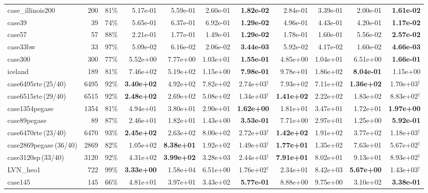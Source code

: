 \documentclass[10pt]{article}
\begin{document}
\begin{landscape}
\begin{table}[H]
\begin{tabular}{lrr rrrr rrrr}
case\_illinois200 & 200 & 81\% & 5.17e-01 & 5.59e-01 & 2.60e-01 & \textbf{1.82e-02} & 2.84e-01 & 3.39e-01 & 2.00e-01 & \textbf{1.61e-02} \\
case39 & 39 & 74\% & 5.65e-01 & 6.37e-01 & 6.92e-01 & \textbf{1.29e-02} & 4.96e-01 & 4.43e-01 & 4.20e-01 & \textbf{1.17e-02} \\
case57 & 57 & 88\% & 2.21e-01 & 1.77e-01 & 1.49e-01 & \textbf{1.29e-02} & 1.78e-01 & 1.60e-01 & 5.56e-02 & \textbf{2.57e-02} \\
case33bw & 33 & 97\% & 5.09e-02 & 6.16e-02 & 2.06e-02 & \textbf{3.44e-03} & 5.92e-02 & 4.17e-02 & 1.60e-02 & \textbf{4.66e-03} \\
case300 & 300 & 77\% & 5.52e+00 & 7.77e+00 & 1.03e+01 & \textbf{1.55e-01} & 4.85e+00 & 1.04e+01 & 6.51e+00 & \textbf{1.66e-01} \\
iceland & 189 & 81\% & 7.46e+02 & 5.19e+02 & 1.15e+00 & \textbf{7.98e-01} & 9.78e+01 & 1.86e+02 & \textbf{8.04e-01} & 1.15e+00 \\
case6495rte\,(25/40) & 6495 & 92\% & \textbf{3.40e+02} & 4.92e+02 & 7.82e+02 & 2.74e+03$^\dagger$ & 7.93e+02 & 7.11e+02 & \textbf{1.36e+02} & 1.70e+03$^\dagger$ \\
case6515rte\,(29/40) & 6515 & 92\% & \textbf{2.48e+02} & 2.69e+02 & 5.08e+02 & 1.34e+03$^\dagger$ & \textbf{1.41e+02} & 2.22e+02 & 1.83e+02 & 8.83e+02$^\dagger$ \\
case1354pegase & 1354 & 81\% & 4.94e+01 & 3.80e+01 & 2.90e+01 & \textbf{1.62e+00} & 1.81e+01 & 3.47e+01 & 1.72e+01 & \textbf{1.97e+00} \\
case89pegase & 89 & 87\% & 2.46e+01 & 1.82e+01 & 1.43e+00 & \textbf{3.53e-01} & 7.71e+00 & 2.97e+01 & 1.25e+00 & \textbf{5.92e-01} \\
case6470rte\,(23/40) & 6470 & 93\% & \textbf{2.45e+02} & 2.63e+02 & 8.00e+02 & 2.72e+03$^\dagger$ & \textbf{1.42e+02} & 1.91e+02 & 3.77e+02 & 1.18e+03$^\dagger$ \\
case2869pegase\,(36/40) & 2869 & 82\% & 1.05e+02 & \textbf{8.38e+01} & 1.92e+02 & 1.49e+03$^\dagger$ & \textbf{1.77e+01} & 1.35e+02 & 7.63e+01 & 5.67e+02$^\dagger$ \\
case3120sp\,(33/40) & 3120 & 92\% & 4.31e+02 & \textbf{3.99e+02} & 3.28e+03 & 2.44e+03$^\dagger$ & \textbf{7.91e+01} & 8.02e+01 & 9.13e+01 & 8.93e+02$^\dagger$ \\
LVN\_heo1 & 722 & 99\% & \textbf{3.33e+00} & 1.58e+04 & 6.51e+00 & 1.76e+02$^\dagger$ & 2.34e+01 & 8.42e+03 & \textbf{5.67e+00} & 1.43e+03$^\dagger$ \\
case145 & 145 & 66\% & 4.81e+01 & 3.97e+01 & 3.43e+02 & \textbf{5.77e-01} & 8.88e+00 & 9.75e+00 & 3.10e+02 & \textbf{3.38e-01} \\

\end{tabular}
\end{table}
\end{landscape}
\end{document}
